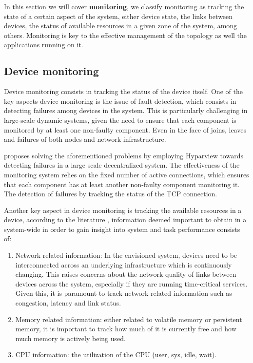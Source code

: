 
In this section we will cover \textbf{monitoring}, we classify monitoring as tracking the state of a certain aspect of the system, either device state, the links between devices, the status of available resources in a given zone of the system, among others. Monitoring is key to the effective management of the topology as well the applications running on it.

\subsection{Device monitoring}

Device monitoring consists in tracking the status of the device itself. One of the key aspects device monitoring is the issue of fault detection, which consists in detecting failures among devices in the system. This is particularly challenging in large-scale dynamic systems, given the need to ensure that each component is monitored by at least one non-faulty component. Even in the face of joins, leaves and failures of both nodes and network infrastructure. 

\textcite{leitao2008large} proposes solving the aforementioned problems by employing Hyparview \cite{Hyparview} towards detecting failures in a large scale decentralized system. The effectiveness of the monitoring system relies on the fixed number of active connections, which ensures that each component has at least another non-faulty component monitoring it. The detection of failures by tracking the status of the TCP connection.

Another key aspect in device monitoring is tracking the available resources in a device, according to the literature \cite{7013000}, information deemed important to obtain in a system-wide in order to gain insight into system and task performance consists of:

\begin{enumerate}

    \item Network related information: In the envisioned system, devices need to be interconnected across an underlying infrastructure which is continuously changing. This raises concerns about the network quality of links between devices across the system, especially if they are running time-critical services. Given this, it is paramount to track network related information such as congestion, latency and link status.
    
    \item Memory related information: either related to volatile memory or persistent memory, it is important to track how  much of it is currently free and how much memory is actively being used.
    
    \item CPU information: the utilization of the CPU (user, sys, idle, wait).
    
\end{enumerate}


